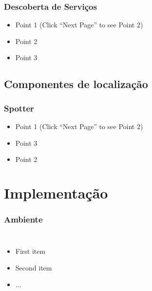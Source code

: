 \documentclass[]{beamer}
\begin{document}
\begin{frame}
  \frametitle{Descoberta de Serviços}   %

  \begin{itemize}
  \item<1-> Point 1 (Click ``Next Page'' to see Point 2) %
  \item<2-> Point 2  %
  \item<3-> Point 3
  \end{itemize}
\end{frame}

\subsection{Componentes de localização}

\begin{frame}
  \frametitle{Spotter}   %

  \begin{itemize}
  \item<1-> Point 1 (Click ``Next Page'' to see Point 2) %
  \item<3-> Point 3
  \item<2-> Point 2  %
  \end{itemize}
\end{frame}


\section{Implementação}

\begin{frame}
  \frametitle{Ambiente}   %
  \begin{columns}[c]
  \column{2in}  %
  \begin{itemize}
  \item<1-> First item
  \item<2-> Second item
  \item<3-> ...
  \end{itemize}
  \column{2in}
  \end{columns}
\end{frame}
\end{document}
